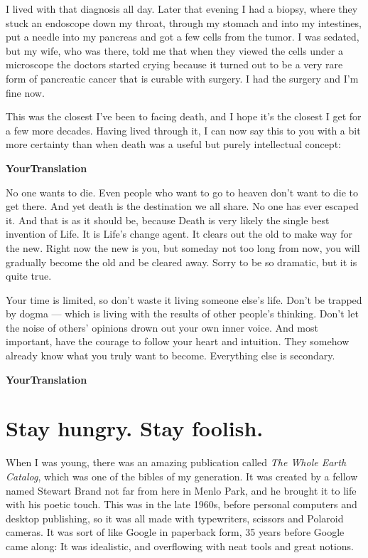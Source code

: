 \documentclass[a4,twocolumn]{article}
\begin{document}
I lived with that diagnosis all day. Later that evening I had a biopsy, where they stuck an endoscope down my throat, through my stomach and into my intestines, put a needle into my pancreas and got a few cells from the tumor. I was sedated, but my wife, who was there, told me that when they viewed the cells under a microscope the doctors started crying because it turned out to be a very rare form of pancreatic cancer that is curable with surgery. I had the surgery and I'm fine now.

This was the closest I've been to facing death, and I hope it's the closest I get for a few more decades. Having lived through it, I can now say this to you with a bit more certainty than when death was a useful but purely intellectual concept:

\newpage

{\bf YourTranslation}

\newpage

No one wants to die. Even people who want to go to heaven don't want to die to get there. And yet death is the destination we all share. No one has ever escaped it. And that is as it should be, because Death is very likely the single best invention of Life. It is Life's change agent. It clears out the old to make way for the new. Right now the new is you, but someday not too long from now, you will gradually become the old and be cleared away. Sorry to be so dramatic, but it is quite true.

Your time is limited, so don't waste it living someone else's life. Don't be trapped by dogma — which is living with the results of other people's thinking. Don't let the noise of others' opinions drown out your own inner voice. And most important, have the courage to follow your heart and intuition. They somehow already know what you truly want to become. Everything else is secondary.

\newpage

{\bf YourTranslation}

\newpage


\section*{Stay hungry. Stay foolish.}

When I was young, there was an amazing publication called \textit{The Whole Earth Catalog}, which was one of the bibles of my generation. It was created by a fellow named Stewart Brand not far from here in Menlo Park, and he brought it to life with his poetic touch. This was in the late 1960s, before personal computers and desktop publishing, so it was all made with typewriters, scissors and Polaroid cameras. It was sort of like Google in paperback form, 35 years before Google came along: It was idealistic, and overflowing with neat tools and great notions.
\end{document}
